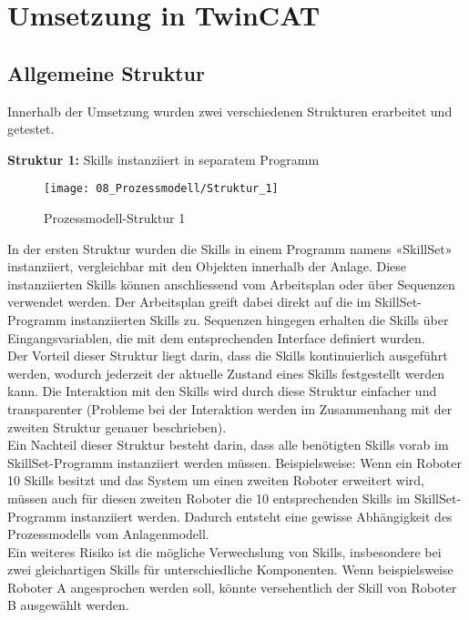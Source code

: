 \section{Umsetzung in TwinCAT}	\label{Umsetzung_Prozessmodell}
	\subsection{Allgemeine Struktur} \label{Prozessmodell_Allgemeine Struktur}
	
		Innerhalb der Umsetzung wurden zwei verschiedenen Strukturen erarbeitet und getestet. 
		
		\textbf{Struktur 1:} Skills instanziiert in separatem Programm
		\vspace{2mm} 
		\vspace{-5mm} 
		\\
		\begin{wrapfigure}{r}{0.5\textwidth}
			\centering
			\texttt{[image: 08\_Prozessmodell/Struktur\_1]}
			\captionsetup{justification=centering}
			\caption{Prozessmodell-Struktur 1}
			\label{fig:Prozessmodell_Struktur_1}
		\end{wrapfigure}
		In der ersten Struktur wurden die Skills in einem Programm namens «SkillSet» instanziiert, vergleichbar mit den Objekten innerhalb der Anlage. Diese instanziierten Skills können anschliessend vom Arbeitsplan oder über Sequenzen verwendet werden. Der Arbeitsplan greift dabei direkt auf die im SkillSet-Programm instanziierten Skills zu. Sequenzen hingegen erhalten die Skills über Eingangsvariablen, die mit dem entsprechenden Interface definiert wurden.
		\\
		Der Vorteil dieser Struktur liegt darin, dass die Skills kontinuierlich ausgeführt werden, wodurch jederzeit der aktuelle Zustand eines Skills festgestellt werden kann. Die Interaktion mit den Skills wird durch diese Struktur einfacher und transparenter (Probleme bei der Interaktion werden im Zusammenhang mit der zweiten Struktur genauer beschrieben).
		\\
		Ein Nachteil dieser Struktur besteht darin, dass alle benötigten Skills vorab im SkillSet-Programm instanziiert werden müssen. Beispielsweise: Wenn ein Roboter 10 Skills besitzt und das System um einen zweiten Roboter erweitert wird, müssen auch für diesen zweiten Roboter die 10 entsprechenden Skills im SkillSet-Programm instanziiert werden. Dadurch entsteht eine gewisse Abhängigkeit des Prozessmodells vom Anlagenmodell.
		\\
		Ein weiteres Risiko ist die mögliche Verwechslung von Skills, insbesondere bei zwei gleichartigen Skills für unterschiedliche Komponenten. Wenn beispielsweise Roboter A angesprochen werden soll, könnte versehentlich der Skill von Roboter B ausgewählt werden.
	
